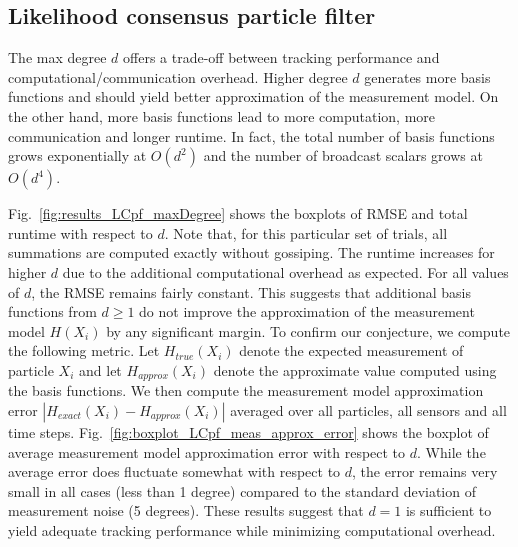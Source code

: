 \documentclass[10pt,letterpaper,final]{article}
\begin{document}
\subsection{Likelihood consensus particle filter}
The max degree $d$ offers a trade-off between tracking performance and computational/communication overhead. Higher degree $d$ generates more basis functions and should yield better approximation of the measurement model. On the other hand, more basis functions lead to more computation, more communication and longer runtime. In fact, the total number of basis functions grows exponentially at $O(d^2)$ and the number of broadcast scalars grows at $O(d^4)$. 

Fig.~\ref{fig:results_LCpf_maxDegree} shows the boxplots of RMSE and total runtime with respect to $d$. Note that, for this particular set of trials, all summations are computed exactly without gossiping. The runtime increases for higher $d$ due to the additional computational overhead as expected. For all values of $d$, the RMSE remains fairly constant. This suggests that additional basis functions from $d\geq 1$ do not improve the approximation of the measurement model $H(X_i)$ by any significant margin. To confirm our conjecture, we compute the following metric. Let $H_{true}(X_i)$ denote the expected measurement of particle $X_i$ and let $H_{approx}(X_i)$ denote the approximate value computed using the basis functions. We then compute the measurement model approximation error $|H_{exact}(X_i)-H_{approx}(X_i)|$ averaged over all particles, all sensors and all time steps. Fig.~\ref{fig:boxplot_LCpf_meas_approx_error} shows the boxplot of average measurement model approximation error with respect to $d$. While the average error does fluctuate somewhat with respect to $d$, the error remains very small in all cases (less than 1 degree) compared to the standard deviation of measurement noise (5 degrees). These results suggest that $d=1$ is sufficient to yield adequate tracking performance while minimizing computational overhead. 
\end{document}
